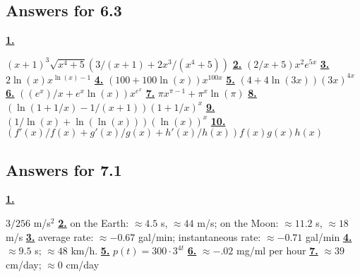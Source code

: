 \subsection *{Answers for 6.3}
\hypertarget {a:6.3.1}{\hyperlink {e:6.3.1}{\bfseries 1.}} \mdseries $(x+1)^3\sqrt {x^4+5}(3/(x+1) + 2x^3/(x^4+5))$\qquad 
\hypertarget {a:6.3.2}{\hyperlink {e:6.3.2}{\bfseries 2.}} \mdseries $(2/x + 5)x^2e^{5x}$\qquad 
\hypertarget {a:6.3.3}{\hyperlink {e:6.3.3}{\bfseries 3.}} \mdseries $2\ln (x)x^{\ln (x)-1}$\qquad 
\hypertarget {a:6.3.4}{\hyperlink {e:6.3.4}{\bfseries 4.}} \mdseries $(100 + 100 \ln (x))x^{100x}$\qquad 
\hypertarget {a:6.3.5}{\hyperlink {e:6.3.5}{\bfseries 5.}} \mdseries $(4+ 4\ln (3x)) (3x)^{4x}$\qquad 
\hypertarget {a:6.3.6}{\hyperlink {e:6.3.6}{\bfseries 6.}} \mdseries $((e^x)/x+ e^x\ln (x))x^{e^x}$\qquad 
\hypertarget {a:6.3.7}{\hyperlink {e:6.3.7}{\bfseries 7.}} \mdseries $\pi x^{\pi -1} + \pi ^x\ln (\pi )$\qquad 
\hypertarget {a:6.3.8}{\hyperlink {e:6.3.8}{\bfseries 8.}} \mdseries $(\ln (1+1/x) - 1/(x+1))(1+1/x)^x$\qquad 
\hypertarget {a:6.3.9}{\hyperlink {e:6.3.9}{\bfseries 9.}} \mdseries $(1/\ln (x)+\ln (\ln (x)))(\ln (x))^x$\qquad 
\hypertarget {a:6.3.10}{\hyperlink {e:6.3.10}{\bfseries 10.}} \mdseries $(f'(x)/f(x) + g'(x)/g(x) + h'(x)/h(x))f(x) g(x) h(x)$\qquad 
\subsection *{Answers for 7.1}
\hypertarget {a:7.1.1}{\hyperlink {e:7.1.1}{\bfseries 1.}} \mdseries $3/256$ m/s$^2$\qquad 
\hypertarget {a:7.1.2}{\hyperlink {e:7.1.2}{\bfseries 2.}} \mdseries on the Earth: $\approx 4.5$ s, $\approx 44$ m/s; on the Moon: $\approx 11.2$ s, $\approx 18$ m/s\qquad 
\hypertarget {a:7.1.3}{\hyperlink {e:7.1.3}{\bfseries 3.}} \mdseries average rate: $\approx -0.67$ gal/min; instantaneous rate: $\approx -0.71$ gal/min\qquad 
\hypertarget {a:7.1.4}{\hyperlink {e:7.1.4}{\bfseries 4.}} \mdseries $\approx 9.5$ s; $\approx 48$ km/h.\qquad 
\hypertarget {a:7.1.5}{\hyperlink {e:7.1.5}{\bfseries 5.}} \mdseries $p(t) = 300\cdot 3^{4t}$\qquad 
\hypertarget {a:7.1.6}{\hyperlink {e:7.1.6}{\bfseries 6.}} \mdseries $\approx -.02$ mg/ml per hour\qquad 
\hypertarget {a:7.1.7}{\hyperlink {e:7.1.7}{\bfseries 7.}} \mdseries $\approx 39$ cm/day; $\approx 0$ cm/day\qquad 
